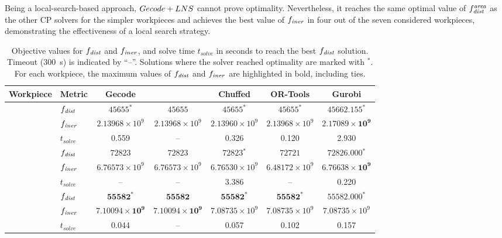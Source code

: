 Being a local-search-based approach, $Gecode+LNS$ cannot prove optimality. Nevertheless, it reaches the same optimal value of $f_{\mathit{dist}}^{\mathit{area}}$ as the other CP solvers for the simpler workpieces and achieves the best value of $\finer$ in four out of the seven considered workpieces, demonstrating the effectiveness of a local search strategy.

\begin{landscape}
	
	\begin{table}[t]
		\centering
		\footnotesize
		\caption{Objective values for $\fdist$ and $\finer$, and solve time $t_{solve}$ in seconds to reach the best $\fdist$ solution. Timeout (300~s) is indicated by ``--''. Solutions where the solver reached optimality are marked with $^*$. For each workpiece, the maximum values of $\fdist$ and $\finer$ are highlighted in bold, including ties.}
		\label{tab:objective_runtime}
		\setlength{\tabcolsep}{2pt}
		\begin{tabular}{llccccc}
			\toprule
			Workpiece & Metric & Gecode & \lns & Chuffed & OR-Tools & Gurobi \\
			\midrule
			
			 & $\fdist$ & $45655{}^*$ & $45655$ & $45655{}^*$ & $45655{}^*$ & $\mathbf{45662.155{}^*}$ \\
			& $\finer$ & $2.13968\times 10^{9}$ & $2.13968\times 10^{9}$ & $2.13960\times 10^{9}$ & $2.13968\times 10^{9}$ & $\mathbf{2.17089\times 10^{9}}$ \\
			& $t_{solve}$ & 0.559 & -- & 0.326 & 0.120 & 2.930 \\
			\midrule
			
			 & $\fdist$ & $72823$ & $72823$ & $72823{}^*$ & $72721$ & $\mathbf{72826.000{}^*}$ \\
			& $\finer$ & $6.76573\times 10^{9}$ & $6.76573\times 10^{9}$ & $6.76530\times 10^{9}$ & $6.48172\times 10^{9}$ & $\mathbf{6.76638\times 10^{9}}$ \\
			& $t_{solve}$ & -- & -- & 3.386 & -- & 0.220 \\
			\midrule
			
			 & $\fdist$ & $\mathbf{55582{}^*}$ & $\mathbf{55582}$ & $\mathbf{55582{}^*}$ & $\mathbf{55582{}^*}$ & $\mathbf{55582.000{}^*}$ \\
			& $\finer$ & $\mathbf{7.10094\times 10^{9}}$ & $\mathbf{7.10094\times 10^{9}}$ & $7.08735\times 10^{9}$ & $7.08735\times 10^{9}$ & $7.08735\times 10^{9}$ \\
			& $t_{solve}$ & 0.044 & -- & 0.057 & 0.102 & 0.157 \\
			\midrule
			

\end{tabular}
\end{table}
\end{landscape}
